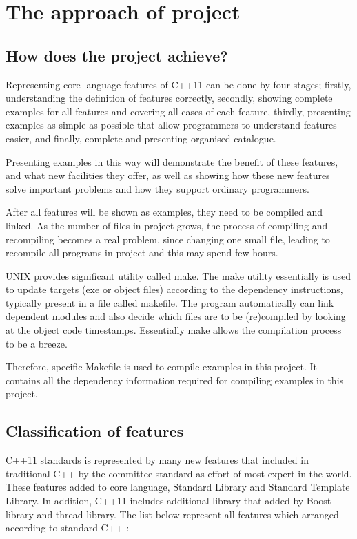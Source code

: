 \documentclass[12pt]{report}
\begin{document}
  
 
\chapter{The approach of project}
\section{How does the project achieve?}
\label{secton: how does the project achieve?}
Representing core language features of C++11 can be done by four stages; firstly, understanding the definition of features correctly, secondly, showing complete examples for all features and covering all cases of each feature, thirdly, presenting examples as simple as possible that allow programmers to understand  features easier, and finally, complete and presenting organised catalogue.

Presenting  examples in this way will  demonstrate the benefit of these features, and what new facilities they offer, as well as showing how these new features solve important problems and how they support ordinary programmers.

After all features will be shown as examples, they need to be compiled and linked. As the number of files in project grows, the process of compiling and recompiling becomes a real problem, since changing one small file, leading to recompile all programs in project and this may spend few hours.

UNIX provides significant utility called make. The make utility essentially is used to update targets (exe or object files) according to the dependency instructions, typically present in a file called makefile. The program automatically can link dependent modules and also decide which files are to be (re)compiled by looking at the object code timestamps. Essentially make allows the compilation process to be a breeze.

Therefore, specific Makefile is used to compile examples in this project. It contains all the dependency information required for compiling examples in this project.



\section{Classification of features}
\label{subsection: overview of features}
C++11 standards is represented by many new features that included in traditional C++ by the committee standard as effort of most expert in the world. These features added  to core language, Standard Library and Standard Template Library. In addition, C++11 includes additional library that added by Boost library and thread library. The list below represent all features which arranged according to standard C++ :-
\end{document}

